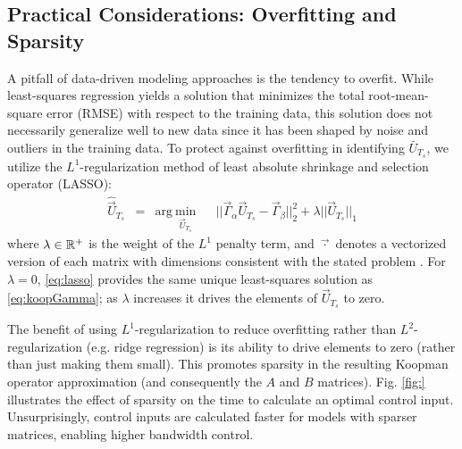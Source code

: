 \subsection{Practical Considerations: Overfitting and Sparsity}

A pitfall of data-driven modeling approaches is the tendency to overfit.
While least-squares regression yields a solution that minimizes the total root-mean-square error (RMSE) with respect to the training data, this solution does not necessarily generalize well to new data since it has been shaped by noise and outliers in the training data.
To protect against overfitting in identifying $\bar{U}_{T_s}$, we utilize the $L^1$-regularization method of least absolute shrinkage and selection operator (LASSO):
\begin{equation}
\begin{aligned}
\hat{\vec{U}}_{T_s} &= 
& \text{arg}~\underset{ \vec{U}_{T_s} }{\text{min}}
& & || \vec{\Gamma}_\alpha \vec{U}_{T_s} - \vec{\Gamma}_\beta ||_2^2 + \lambda || \vec{U}_{T_s} ||_1
\label{eq:lasso}
\end{aligned}
\end{equation}
where $\lambda \in \mathbb{R}^{+}$ is the weight of the $L^1$ penalty term, and $\vec{\cdot}$ denotes a vectorized version of each matrix with dimensions consistent with the stated problem \cite{tibshirani1996regression} .
For $\lambda = 0$, \eqref{eq:lasso} provides the same unique least-squares solution as \eqref{eq:koopGamma}; as $\lambda$ increases it drives the elements of $\vec{U}_{T_s}$ to zero.

The benefit of using $L^1$-regularization to reduce overfitting rather than $L^2$-regularization (e.g. ridge regression) is its ability to drive elements to zero (rather than just making them small).
This promotes sparsity in the resulting Koopman operator approximation (and consequently the $A$ and $B$ matrices).
Fig. \ref{fig:} illustrates the effect of sparsity on the time to calculate an optimal control input.
Unsurprisingly, control inputs are calculated faster for models with sparser matrices, enabling higher bandwidth control.

